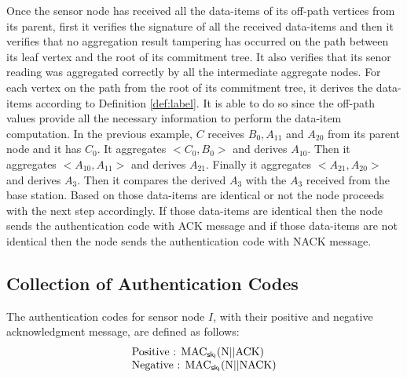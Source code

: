 		Once the sensor node has received all the data-items of its off-path vertices from its parent, first it verifies the signature of all the received data-items and then it verifies that no aggregation result tampering has occurred on the path between its leaf vertex and the root of its commitment tree.
		It also verifies that its senor reading was aggregated correctly by all the intermediate aggregate nodes.
		For each vertex on the path from the root of its commitment tree, it derives the data-items according to Definition \ref{def:label}.
		It is able to do so since the off-path values provide all the necessary information to perform the data-item computation.
		In the previous example, $C$ receives $B_{0}, A_{11}$ and $ A_{20}$ from its parent node and it has $C_{0}$.
		It aggregates $<C_{0}, B_{0}>$ and derives $A_{10}$.
		Then it aggregates $<A_{10},A_{11}>$ and derives $A_{21}$.
		Finally it aggregates $<A_{21}, A_{20}>$ and derives $A_{3}$.
		Then it compares the derived $A_{3}$ with the $A_{3}$ received from the base station.
		Based on those data-items are identical or not the node proceeds with the next step accordingly.
		If those data-items are identical then the node sends the authentication code with ACK message and if those data-items are not identical then the node sends the authentication code with NACK message.

	\subsection{Collection of Authentication Codes}
		\label{subsection:collection-of-authentication-codes}
		The authentication codes for sensor node $I$, with their positive and negative acknowledgment message, are defined as follows:
		\begin{equation}
			\begin{array}{l}
				\mbox{Positive : } \mbox{MAC}_{\sf{sk}_{I}}(\mbox{N} || \mbox{ACK})\\
				\mbox{Negative : } \mbox{MAC}_{\sf{sk}_{I}}(\mbox{N} || \mbox{NACK})
			\end{array}
		\end{equation}

